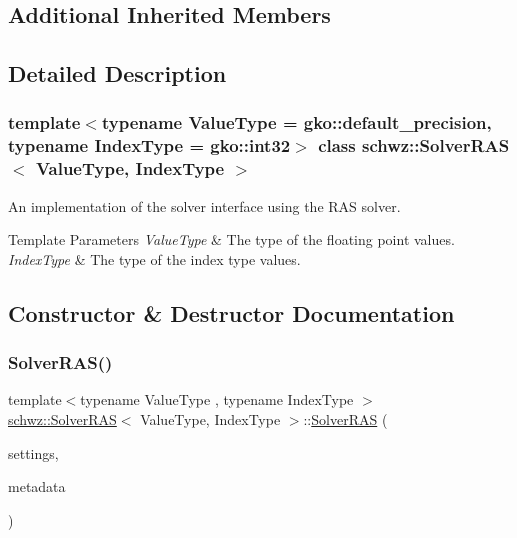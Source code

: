 \subsection*{Additional Inherited Members}


\subsection{Detailed Description}
\subsubsection*{template$<$typename Value\+Type = gko\+::default\+\_\+precision, typename Index\+Type = gko\+::int32$>$\newline
class schwz\+::\+Solver\+R\+A\+S$<$ Value\+Type, Index\+Type $>$}

An implementation of the solver interface using the R\+AS solver. 


\begin{DoxyTemplParams}{Template Parameters}
{\em Value\+Type} & The type of the floating point values. \\
\hline
{\em Index\+Type} & The type of the index type values. \\
\hline
\end{DoxyTemplParams}


\subsection{Constructor \& Destructor Documentation}
\mbox{\label{classschwz_1_1SolverRAS_a3af020a3c088ad73024c00b2af4910f0}} 
\subsubsection{\texorpdfstring{Solver\+R\+A\+S()}{SolverRAS()}}
{\footnotesize\ttfamily template$<$typename Value\+Type , typename Index\+Type $>$ \\
\hyperlink{classschwz_1_1SolverRAS}{schwz\+::\+Solver\+R\+AS}$<$ Value\+Type, Index\+Type $>$\+::\hyperlink{classschwz_1_1SolverRAS}{Solver\+R\+AS} (\begin{DoxyParamCaption}\item[{\hyperlink{structschwz_1_1Settings}{Settings} \&}]{settings,  }\item[{\hyperlink{structschwz_1_1Metadata}{Metadata}$<$ Value\+Type, Index\+Type $>$ \&}]{metadata }\end{DoxyParamCaption})}



